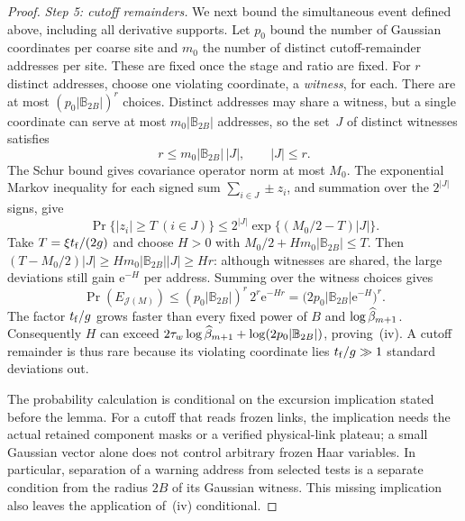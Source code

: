 \begin{proof}
\emph{Step 5: cutoff remainders.} We next bound the simultaneous event defined above, including all derivative supports. Let $p_0$ bound the number of Gaussian coordinates per coarse site and $m_0$ the number of distinct cutoff-remainder addresses per site. These are fixed once the stage and ratio are fixed. For $r$ distinct addresses, choose one violating coordinate, a \emph{witness}, for each. There are at most $(p_0|\mathbb B_{2B}|)^r$ choices. Distinct addresses may share a witness, but a single coordinate can serve at most $m_0|\mathbb B_{2B}|$ addresses, so the set~$J$ of distinct witnesses satisfies
\begin{equation*}
r\le m_0|\mathbb B_{2B}|\,|J|,\qquad |J|\le r.
\end{equation*}
The Schur bound gives covariance operator norm at most $M_0$. The exponential Markov inequality for each signed sum $\sum_{i\in J}\pm z_i$, and summation over the $2^{|J|}$ signs, give
\begin{equation*}
\Pr\{|z_i|\ge T\ (i\in J)\}\le2^{|J|}\exp\{(M_0/2-T)|J|\}.
\end{equation*}
Take $T=\xi t_{\rm f}/(2g)$ and choose $H>0$ with $M_0/2+Hm_0|\mathbb B_{2B}|\le T$. Then $(T-M_0/2)|J|\ge Hm_0|\mathbb B_{2B}||J|\ge Hr$: although witnesses are shared, the large deviations still gain $\mathrm e^{-H}$ per address. Summing over the witness choices gives
\begin{equation*}
\Pr(E_{\mathcal J(M)})\le(p_0|\mathbb B_{2B}|)^r\,2^r\mathrm e^{-Hr}=
\bigl(2p_0|\mathbb B_{2B}|\mathrm e^{-H}\bigr)^r.
\end{equation*}
The factor $t_{\rm f}/g$ grows faster than every fixed power of $B$ and $\log\widehat{\beta}_{m+1}$. Consequently $H$ can exceed $2\tau_w\log\widehat{\beta}_{m+1}+\log(2p_0|\mathbb B_{2B}|)$, proving~(iv). A cutoff remainder is thus rare because its violating coordinate lies $t_{\rm f}/g\gg1$ standard deviations out.

The probability calculation is conditional on the excursion implication stated before the lemma. For a cutoff that reads frozen links, the implication needs the actual retained component masks or a verified physical-link plateau; a small Gaussian vector alone does not control arbitrary frozen Haar variables. In particular, separation of a warning address from selected tests is a separate condition from the radius $2B$ of its Gaussian witness. This missing implication also leaves the application of~(iv) conditional.


\end{proof}
